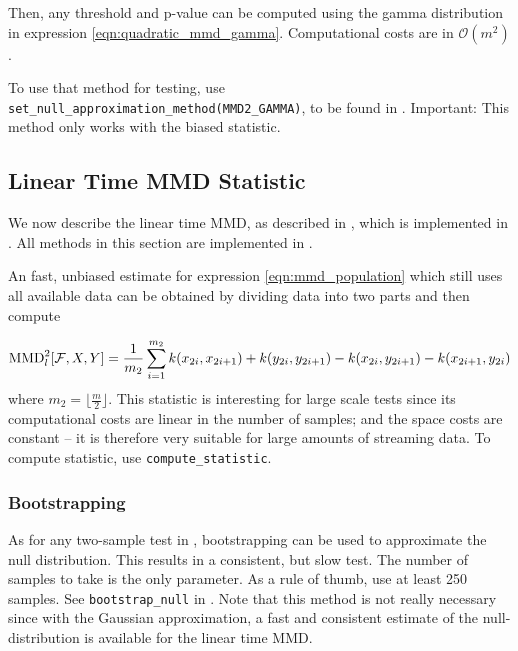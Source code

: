 Then, any threshold and p-value can be computed using the gamma distribution in expression \ref{eqn:quadratic_mmd_gamma}. Computational costs are in $\mathcal{O}(m^2)$.

To use that method for testing, use \texttt{set\_null\_approximation\_method(MMD2\_GAMMA)}, to be found in . Important: This method only works with the biased statistic.


\subsection{Linear Time MMD Statistic}
\label{sec:mmd_linear}
We now describe the linear time MMD, as described in \citep[Section
6]{Gretton2012}, which is implemented in \shogun{}. All methods in this section are implemented in .

An fast, unbiased estimate for expression \ref{eqn:mmd_population} which still uses all available data can be obtained by dividing data into two parts and then compute

\begin{align*}
\operatorname{MMD}_l^2[\mathcal{F},X,Y]=\frac{1}{m_2}\sum_{i=1}^{m_2} k(x_{2i},x_{2i+1})+k(y_{2i},y_{2i+1})-k(x_{2i},y_{2i+1})-
  k(x_{2i+1},y_{2i})
\end{align*}
where $ m_2=\lfloor\frac{m}{2} \rfloor$. This statistic is interesting for large scale tests since its computational costs are linear in the number of samples; and the space costs are constant -- it is therefore very suitable for large amounts of streaming data. To compute statistic, use \texttt{compute\_statistic}.

\subsubsection{Bootstrapping}
As for any two-sample test in \shogun{}, bootstrapping can be used to approximate the null distribution. This results in a consistent, but slow test. The number of samples to take is the only parameter. As a rule of thumb, use at least 250 samples.
See \texttt{bootstrap\_null} in . Note that this method is not really necessary since with the Gaussian approximation, a fast and consistent estimate of the null-distribution is available for the linear time MMD.


